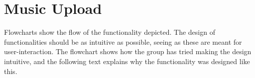 \section{Music Upload}
Flowcharts show the flow of the functionality depicted. The design of functionalities should be as intuitive as possible, seeing as these are meant for user-interaction. The flowchart shows how the group has tried making the design intuitive, and the following text explains why the functionality was designed like this.

